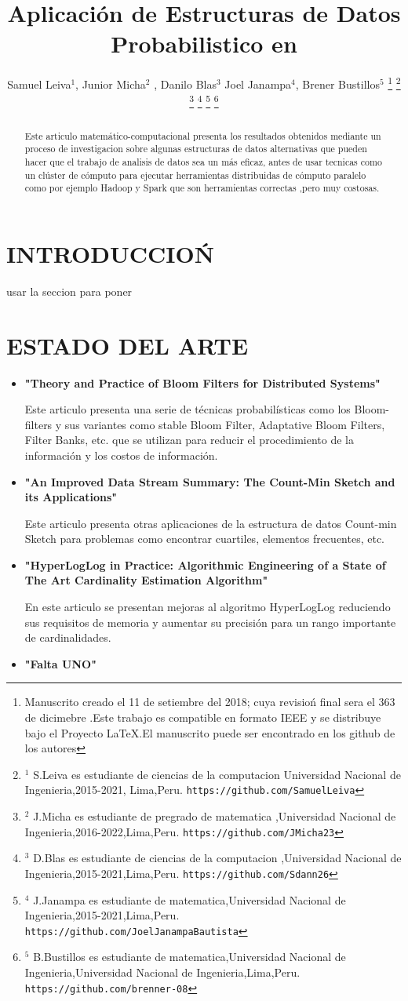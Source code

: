 \documentclass[journal]{IEEEtran}
\title{\LARGE \bf Aplicaci\'on de Estructuras de Datos Probabilistico en
}
\author{Samuel Leiva$^{1}$, Junior Micha$^{2}$ , Danilo Blas$^{3}$ Joel Janampa$^{4}$, Brener Bustillos$^{5}$%
\thanks{Manuscrito creado el 11 de setiembre del 2018; cuya revisio\'n final sera el 363 de dicimebre .Este trabajo es compatible en formato IEEE y se distribuye bajo el Proyecto LaTeX.El manuscrito puede ser encontrado en los github de los autores}%
\thanks{$^{1}$ S.Leiva es estudiante de ciencias de la computacion 
        Universidad Nacional de Ingenieria,2015-2021, Lima,Peru.
        {\tt\small https://github.com/SamuelLeiva}}%
\thanks{$^{2}$ J.Micha es estudiante de pregrado de matematica ,Universidad Nacional de Ingenieria,2016-2022,Lima,Peru.
        {\tt\small https://github.com/JMicha23}}%
\thanks{$^{3}$ D.Blas es estudiante de ciencias de la computacion ,Universidad Nacional de Ingenieria,2015-2021,Lima,Peru.
        {\tt\small https://github.com/Sdann26}}%
\thanks{$^{4}$ J.Janampa es estudiante de matematica,Universidad Nacional de Ingenieria,2015-2021,Lima,Peru.
        {\tt\small https://github.com/JoelJanampaBautista}}%
\thanks{$^{5}$ B.Bustillos es estudiante de matematica,Universidad Nacional de Ingenieria,Universidad Nacional de Ingenieria,Lima,Peru. 
        {\tt\small https://github.com/brenner-08}}%
}
\begin{document}
\maketitle
\thispagestyle{empty}
\pagestyle{empty}


\begin{abstract}
    

Este articulo matemático-computacional presenta los resultados obtenidos mediante un proceso de investigacion sobre algunas estructuras de datos alternativas que pueden hacer que el trabajo de analisis de datos sea un más eficaz, antes de usar tecnicas como un clúster de cómputo para ejecutar herramientas distribuidas de cómputo paralelo como por ejemplo  Hadoop y Spark que son herramientas correctas ,pero muy costosas.

\end{abstract}


\section{INTRODUCCIO\'N}

usar la seccion para poner 

\section{ESTADO DEL ARTE}

\begin{itemize}

\item \textbf{"Theory and Practice of Bloom Filters for Distributed Systems"}

Este articulo presenta una serie de técnicas probabilísticas como los Bloom-filters y sus variantes como stable Bloom Filter, Adaptative Bloom Filters, Filter Banks, etc. que se utilizan para reducir el procedimiento de la información y los costos de información.\\

\item \textbf{"An Improved Data Stream Summary: The Count-Min Sketch and its Applications"}

Este articulo presenta otras aplicaciones de la estructura de datos Count-min Sketch para problemas como encontrar cuartiles, elementos frecuentes, etc.\\

\item \textbf{"HyperLogLog in Practice: Algorithmic Engineering of a State of The Art Cardinality Estimation Algorithm"}

En este articulo se presentan mejoras al algoritmo HyperLogLog reduciendo sus requisitos de memoria y aumentar su precisión para un rango importante de cardinalidades.\\

\item \bf"Falta UNO" 

\end{itemize}
\end{document}
